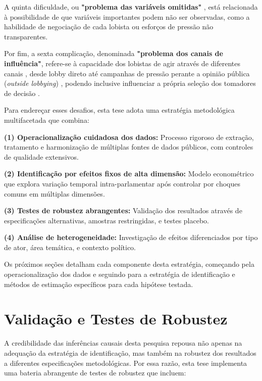 A quinta dificuldade, ou \textbf{"problema das variáveis omitidas"} \cite{de_figueiredo_advancing_2014}, está relacionada à possibilidade de que variáveis importantes podem não ser observadas, como a habilidade de negociação de cada lobista ou esforços de pressão não transparentes.

Por fim, a sexta complicação, denominada \textbf{"problema dos canais de influência"}, refere-se à capacidade dos lobistas de agir através de diferentes canais \cite{dur_measuring_2008}, desde lobby direto até campanhas de pressão perante a opinião pública (\textit{outside lobbying}) \cite{kollman1998outside}, podendo inclusive influenciar a própria seleção dos tomadores de decisão \cite{fordham2003selection}.

Para endereçar esses desafios, esta tese adota uma estratégia metodológica multifacetada que combina:

\textbf{(1) Operacionalização cuidadosa dos dados:} Processo rigoroso de extração, tratamento e harmonização de múltiplas fontes de dados públicos, com controles de qualidade extensivos.

\textbf{(2) Identificação por efeitos fixos de alta dimensão:} Modelo econométrico que explora variação temporal intra-parlamentar após controlar por choques comuns em múltiplas dimensões.

\textbf{(3) Testes de robustez abrangentes:} Validação dos resultados através de especificações alternativas, amostras restringidas, e testes placebo.

\textbf{(4) Análise de heterogeneidade:} Investigação de efeitos diferenciados por tipo de ator, área temática, e contexto político.

Os próximos seções detalham cada componente desta estratégia, começando pela operacionalização dos dados e seguindo para a estratégia de identificação e métodos de estimação específicos para cada hipótese testada.







\section{Validação e Testes de Robustez}

A credibilidade das inferências causais desta pesquisa repousa não apenas na adequação da estratégia de identificação, mas também na robustez dos resultados a diferentes especificações metodológicas. Por essa razão, esta tese implementa uma bateria abrangente de testes de robustez que incluem:

